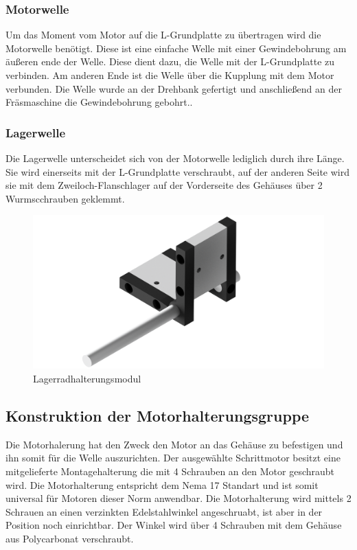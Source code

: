 \subsubsection{Motorwelle}
Um das Moment vom Motor auf die L-Grundplatte zu übertragen wird die Motorwelle benötigt. Diese ist eine einfache Welle
mit einer Gewindebohrung am äußeren ende der Welle. Diese dient dazu, die Welle mit der L-Grundplatte zu verbinden.
Am anderen Ende ist die Welle über die Kupplung mit dem Motor verbunden.
Die Welle wurde an der Drehbank gefertigt und anschließend an der Fräsmaschine die Gewindebohrung gebohrt..

\subsubsection{Lagerwelle}
Die Lagerwelle unterscheidet sich von der Motorwelle lediglich durch ihre Länge. Sie wird einerseits mit der
L-Grundplatte verschraubt, auf der anderen Seite wird sie mit dem Zweiloch-Flanschlager auf der Vorderseite des Gehäuses über
2 Wurmscchrauben geklemmt.

\begin{figure}[H]
    \centering
    \includegraphics[scale=0.25,page=1]{fig/mech/LagerRadGruppekomplett}
    \caption{Lagerradhalterungsmodul}
\end{figure}

\subsection{Konstruktion der Motorhalterungsgruppe}

Die Motorhalerung hat den Zweck den Motor an das Gehäuse zu befestigen und ihn somit für die Welle auszurichten. Der ausgewählte Schrittmotor
besitzt eine mitgelieferte Montagehalterung die mit 4 Schrauben an den Motor geschraubt wird. Die Motorhalterung entspricht dem Nema 17
Standart und ist somit universal für Motoren dieser Norm anwendbar. Die Motorhalterung wird mittels 2 Schrauen an einen verzinkten Edelstahlwinkel angeschruabt, ist aber
in der Position noch einrichtbar. Der Winkel wird über 4 Schrauben mit dem Gehäuse aus Polycarbonat verschraubt.

